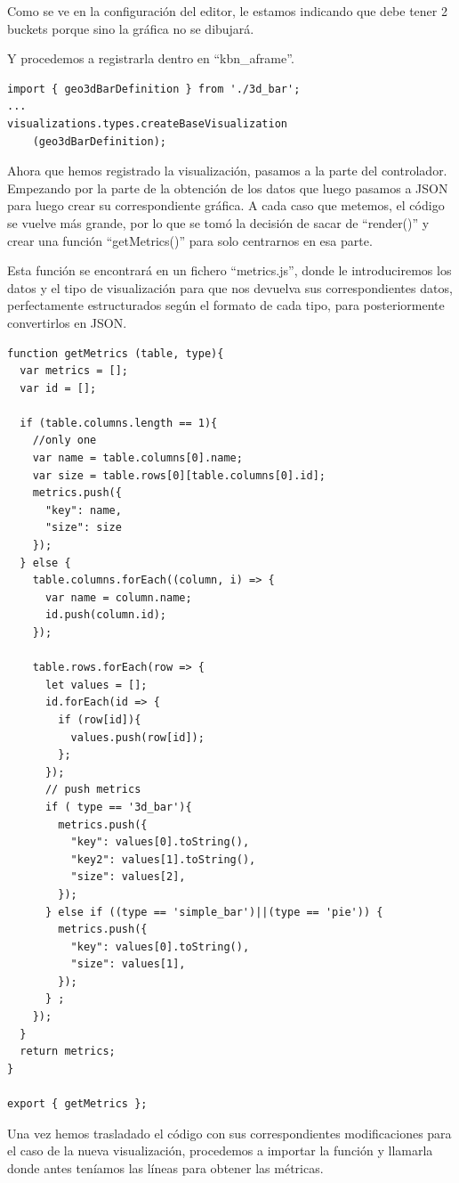 \documentclass[a4paper, 12pt]{book}
\begin{document}
Como se ve en la configuración del editor, le estamos indicando que debe tener 2 buckets porque sino la gráfica no se dibujará.

Y procedemos a registrarla dentro en “kbn\_aframe”.

\begin{lstlisting}[frame=single]
import { geo3dBarDefinition } from './3d_bar';
...
visualizations.types.createBaseVisualization
    (geo3dBarDefinition);
\end{lstlisting}

Ahora que hemos registrado la visualización, pasamos a la parte del controlador. Empezando por la parte de la obtención de los datos que luego pasamos a JSON para luego crear su correspondiente gráfica. A cada caso que metemos, el código se vuelve más grande, por lo que se tomó la decisión de sacar de “render()” y crear una función “getMetrics()” para solo centrarnos en esa parte. 

Esta función se encontrará en un fichero “metrics.js”, donde le introduciremos los datos y el tipo de visualización para que nos devuelva sus correspondientes datos, perfectamente estructurados según el formato de cada tipo, para posteriormente convertirlos en JSON.

\begin{lstlisting}[frame=single]
function getMetrics (table, type){
  var metrics = [];
  var id = [];

  if (table.columns.length == 1){
    //only one
    var name = table.columns[0].name;
    var size = table.rows[0][table.columns[0].id];
    metrics.push({
      "key": name,
      "size": size
    });
  } else {
    table.columns.forEach((column, i) => {
      var name = column.name;
      id.push(column.id);
    });

    table.rows.forEach(row => {
      let values = [];
      id.forEach(id => {
        if (row[id]){
          values.push(row[id]);
        };
      });
      // push metrics
      if ( type == '3d_bar'){
        metrics.push({
          "key": values[0].toString(),
          "key2": values[1].toString(),
          "size": values[2],
        });
      } else if ((type == 'simple_bar')||(type == 'pie')) {
        metrics.push({
          "key": values[0].toString(),
          "size": values[1],
        });
      } ;
    });
  }
  return metrics;
}

export { getMetrics };
\end{lstlisting}

Una vez hemos trasladado el código con sus correspondientes modificaciones para el caso de la nueva visualización, procedemos a importar la función y llamarla donde antes teníamos las líneas para obtener las métricas.
\end{document}
